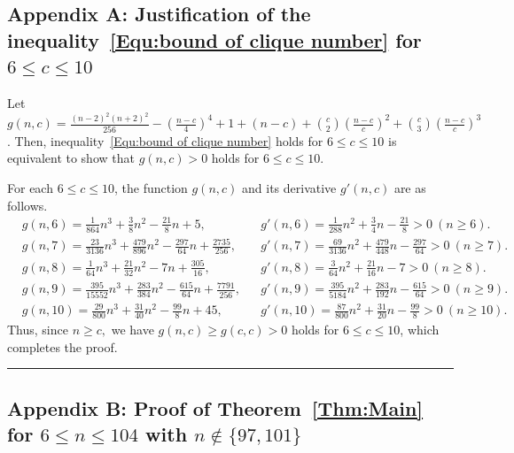 \documentclass[11pt,a4paper]{article}
\def\QED{\hfill \rule{7pt}{7pt}}
\begin{document}
\subsection*{Appendix A: Justification of the inequality~\eqref{Equ:bound of clique number} for $6\le c \le 10$}\label{Sec:Appendix A}

Let $g(n,c)=\frac{(n-2)^2(n+2)^2}{256}-\left(\frac{n-c}{4}\right)^4 +1 +(n-c)+\binom c2\left(\frac{n-c}{c}\right)^2 +\binom{c}{3}\left(\frac{n-c}{c}\right)^3$. 
Then, inequality~\eqref{Equ:bound of clique number} holds for $6\le c \le 10$ is equivalent to show that $g(n,c)>0$ holds for $6\le c \le 10.$

For each $6\le c\le 10$, the function $g(n,c)$ and its derivative $g'(n,c)$ are as follows.
\vspace{-0.4cm}
\begin{align*} 
&g(n,6)   = \tfrac{1}{864}n^3 + \tfrac{3}{8}n^2 - \tfrac{21}{8}n + 5, 
& &g'(n,6)   = \tfrac{1}{288}n^2 + \tfrac{3}{4}n - \tfrac{21}{8} > 0 \ (n \geq 6). \\
&g(n,7)   = \tfrac{23}{3136}n^3 + \tfrac{479}{896}n^2 - \tfrac{297}{64}n + \tfrac{2735}{256}, 
& &g'(n,7)   = \tfrac{69}{3136}n^2 + \tfrac{479}{448}n - \tfrac{297}{64} > 0 \ (n \geq 7). \\ 
&g(n,8)   = \tfrac{1}{64}n^3 + \tfrac{21}{32}n^2 - 7n + \tfrac{305}{16},
& &g'(n,8)   = \tfrac{3}{64}n^2 + \tfrac{21}{16}n - 7 > 0 \ (n \geq 8). \\
&g(n,9)   = \tfrac{395}{15552}n^3 + \tfrac{283}{384}n^2 - \tfrac{615}{64}n + \tfrac{7791}{256}, 
& &g'(n,9)   = \tfrac{395}{5184}n^2 + \tfrac{283}{192}n - \tfrac{615}{64} > 0 \ (n \geq 9). \\
&g(n,10)  = \tfrac{29}{800}n^3 + \tfrac{31}{40}n^2 - \tfrac{99}{8}n + 45,
& &g'(n,10)  = \tfrac{87}{800}n^2 + \tfrac{31}{20}n - \tfrac{99}{8} > 0 \ (n \geq 10).  
\end{align*}
Thus, since $n\ge c,$ we have $g(n,c)\ge g(c,c)>0$ holds for $6\le c\le 10$, which completes the proof.
\QED

\subsection*{Appendix B: Proof of Theorem~\ref{Thm:Main} for $6 \leq n \leq 104$ with $n \not\in \{97,101\}$}
\end{document}
